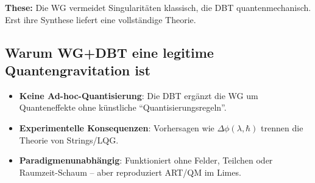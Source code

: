 \begin{tcolorbox}[colback=white, colframe=black, width=\textwidth]
    \textbf{These:} Die WG vermeidet Singularitäten klassisch, die DBT quantenmechanisch. Erst ihre Synthese liefert eine vollständige Theorie.
\end{tcolorbox}


\subsection*{Warum WG+DBT eine legitime Quantengravitation ist}  
\begin{itemize}  
\item \textbf{Keine Ad-hoc-Quantisierung}: Die DBT ergänzt die WG um Quanteneffekte ohne künstliche \enquote{Quantisierungsregeln}.  
\item \textbf{Experimentelle Konsequenzen}: Vorhersagen wie $\Delta\phi(\lambda, \hbar)$ trennen die Theorie von Strings/LQG.  
\item \textbf{Paradigmenunabhängig}: Funktioniert ohne Felder, Teilchen oder Raumzeit-Schaum – aber reproduziert ART/QM im Limes.  
\end{itemize}

